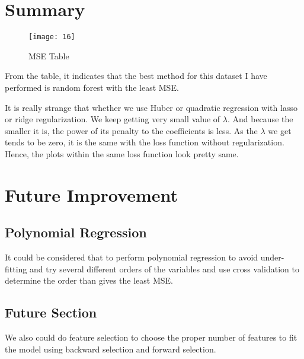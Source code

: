 \documentclass[12pt,twocolumn,twoside]{article}
\begin{document}
\section{Summary}
\begin{figure}[h]
\texttt{[image: 16]}
\caption{MSE Table}
\end{figure}
From the table, it indicates that the best method for this dataset I have performed is random forest with the least MSE.

It is really strange that whether we use Huber or quadratic regression with lasso or ridge regularization. We keep getting very small value of $\lambda$. And because the smaller it is, the power of its penalty to the coefficients is less. As the $\lambda$ we get tends to be zero, it is the same with the loss function without regularization. Hence, the plots within the same loss function look pretty same. 

\section{Future Improvement}
\subsection{Polynomial Regression}
It could be considered that to perform polynomial regression to avoid under-fitting and try several different orders of the variables and use cross validation to determine the order than gives the least MSE.

\subsection{Future Section}
We also could do feature selection to choose the proper number of features to fit the model using backward selection and forward selection. 

\lipsum[0]
\end{document}

